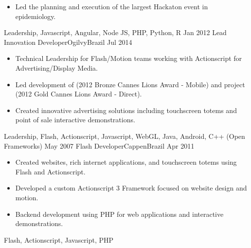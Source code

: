 \begin{experiences}
{\begin{itemize}
                        \item Led the planning and execution of  the largest Hackaton event in epidemiology.
                      \end{itemize}
                    }
                    {Leadership, Javascript, Angular, Node JS, PHP, Python, R}
  \emptySeparator
  \experience
    {Jan 2012}     {Lead Innovation Developer}{Ogilvy}{Brazil}
    {Jul 2014}    {
                      \begin{itemize}
                        \item Technical Leadership for Flash/Motion teams working with Actionscript for Advertising/Display Media.
                        \item Led development of  (2012 Bronze Cannes Lions Award - Mobile) and  project (2012 Gold Cannes Lions Award - Direct).
                        \item Created innovative advertising solutions including touchscreen totems and point of sale interactive demonstrations.
                      \end{itemize}
                    }
                    {Leadership, Flash, Actionscript, Javascript, WebGL, Java, Android, C++ (Open Frameworks)}
  \emptySeparator
  \experience
    {May 2007}     {Flash Developer}{Cappen}{Brazil}
    {Apr 2011}    {
                      \begin{itemize}
                        \item Created websites, rich internet applications, and touchscreen totems using Flash and Actionscript.
                        \item Developed a custom Actionscript 3 Framework focused on website design and motion.
                        \item Backend development using PHP for web applications and interactive demonstrations.
                      \end{itemize}
                    }
                    {Flash, Actionscript, Javascript, PHP}
  \emptySeparator
\end{experiences}
